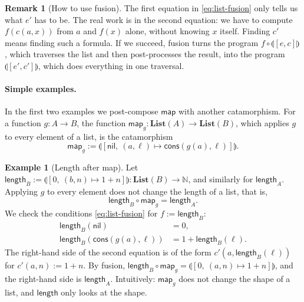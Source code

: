 \documentclass[a4paper,11pt, oneside,titlepage=false]{scrbook}
\theoremstyle{plain}
\theoremstyle{definition}
\newtheorem{rem}[thm]{Remark}
\newtheorem{exa}[thm]{Example}
\newcommand{\Catb}[1]{\mathbf{#1}}
\newcommand{\List}{\Catb{List}}
\newcommand{\catam}[1]{\llparenthesis #1 \rrparenthesis}
\newcommand{\nil}{\ensuremath{\mathsf{nil}}}
\newcommand{\cons}{\ensuremath{\mathsf{cons}}}
\newcommand{\NN}{\ensuremath{\mathbb{N}}}
\begin{document}
\begin{rem}[How to use fusion]\label{rem:how-to-fuse}
  The first equation in \eqref{eq:list-fusion} only tells us what $e'$ has to be.
  The real work is in the second equation: we have to compute $f(c(a,x))$ from $a$ and $f(x)$ alone, without knowing $x$ itself.
  Finding $c'$ means finding such a formula.
  If we succeed, fusion turns the program $f \circ \catam{[e,c]}$, which traverses the list and then post-processes the result, into the program $\catam{[e',c']}$, which does everything in one traversal.
\end{rem}

\paragraph{Simple examples.}
In the first two examples we post-compose $\mathsf{map}$ with another catamorphism.
For a function $g : A \to B$, the function $\mathsf{map}_g : \List(A) \to \List(B)$, which applies $g$ to every element of a list, is the catamorphism
\[ \mathsf{map}_g := \catam{[\nil,\ (a, \ell) \mapsto \cons(g(a), \ell)]}. \]

\begin{exa}[Length after map]\label{exa:fusion-length-map}
  Let $\mathsf{length}_B := \catam{[0,\ (b, n) \mapsto 1 + n]} : \List(B) \to \NN$, and similarly for $\mathsf{length}_A$.
  Applying $g$ to every element does not change the length of a list, that is,
  \[ \mathsf{length}_B \circ \mathsf{map}_g = \mathsf{length}_A. \]
  We check the conditions \eqref{eq:list-fusion} for $f := \mathsf{length}_B$:
  \begin{align*}
    \mathsf{length}_B(\nil) &= 0, \\
    \mathsf{length}_B(\cons(g(a), \ell)) &= 1 + \mathsf{length}_B(\ell).
  \end{align*}
  The right-hand side of the second equation is of the form $c'(a, \mathsf{length}_B(\ell))$ for $c'(a, n) := 1 + n$.
  By fusion, $\mathsf{length}_B \circ \mathsf{map}_g = \catam{[0,\ (a,n) \mapsto 1 + n]}$, and the right-hand side is $\mathsf{length}_A$.
  Intuitively: $\mathsf{map}_g$ does not change the shape of a list, and $\mathsf{length}$ only looks at the shape.
\end{exa}
\end{document}
